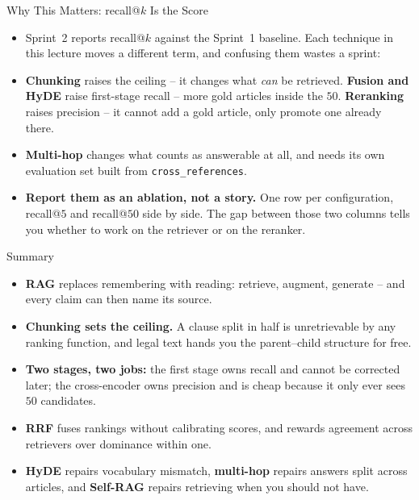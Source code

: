 \begin{frame}{Why This Matters: recall@\texorpdfstring{$k$}{k} Is the Score}
\begin{itemize}
  \item Sprint~2 reports recall@$k$ against the Sprint~1 baseline. Each technique in this lecture moves a different term, and confusing them wastes a sprint:
  \pause
  \item \textbf{Chunking} raises the ceiling -- it changes what \emph{can} be retrieved. \textbf{Fusion and HyDE} raise first-stage recall -- more gold articles inside the $50$. \textbf{Reranking} raises precision -- it cannot add a gold article, only promote one already there.
  \pause
  \item \textbf{Multi-hop} changes what counts as answerable at all, and needs its own evaluation set built from \texttt{cross\_references}.
  \pause
  \item \textbf{Report them as an ablation, not a story.} One row per configuration, recall@$5$ and recall@$50$ side by side. The gap between those two columns tells you whether to work on the retriever or on the reranker.
\end{itemize}
\end{frame}

\begin{frame}{Summary}
\begin{itemize}
  \item \textbf{RAG} replaces remembering with reading: retrieve, augment, generate -- and every claim can then name its source.
  \pause
  \item \textbf{Chunking sets the ceiling.} A clause split in half is unretrievable by any ranking function, and legal text hands you the parent--child structure for free.
  \pause
  \item \textbf{Two stages, two jobs:} the first stage owns recall and cannot be corrected later; the cross-encoder owns precision and is cheap because it only ever sees $50$ candidates.
  \pause
  \item \textbf{RRF} fuses rankings without calibrating scores, and rewards agreement across retrievers over dominance within one.
  \pause
  \item \textbf{HyDE} repairs vocabulary mismatch, \textbf{multi-hop} repairs answers split across articles, and \textbf{Self-RAG} repairs retrieving when you should not have.
\end{itemize}
\end{frame}

